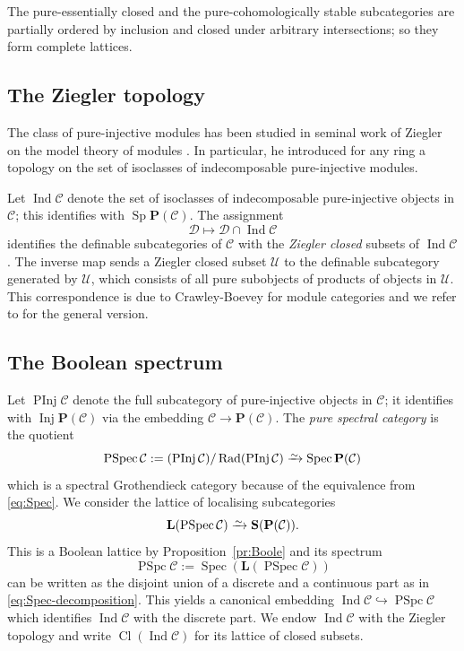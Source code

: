\documentclass[a4paper]{amsart}
\theoremstyle{plain}
\theoremstyle{definition}
\theoremstyle{remark}
\numberwithin{equation}{section}
\newcommand{\Cl}{\operatorname{Cl}}
\newcommand{\Ind}{\operatorname{Ind}}
\newcommand{\Inj}{\operatorname{Inj}}
\newcommand{\PInj}{\operatorname{PInj}}
\newcommand{\PSpc}{\operatorname{PSpc}}
\newcommand{\PSpec}{\operatorname{PSpec}}
\newcommand{\Rad}{\operatorname{Rad}}
\newcommand{\Sp}{\operatorname{Sp}}
\newcommand{\Spec}{\operatorname{Spec}}
\newcommand{\iso}{\xrightarrow{\raisebox{-.4ex}[0ex][0ex]{$\scriptstyle{\sim}$}}}
\def\C{\mathcal C}
\def\D{\mathcal D}
\def\U{\mathcal U}
\def\bfL{\mathbf L}
\def\bfP{\mathbf P}
\def\bfS{\mathbf S}
\begin{document}
The pure-essentially closed and the pure-cohomologically stable subcategories are partially
ordered by inclusion and closed under arbitrary intersections; so they
form complete lattices.


\subsection*{The Ziegler topology}

The class of pure-injective modules has been studied in seminal work
of Ziegler on the model theory of modules \cite{Zi1984}. In
particular, he introduced for any ring a topology on the set of isoclasses of
indecomposable pure-injective modules.

Let $\Ind\C$ denote the set of isoclasses of indecomposable
pure-injective objects in $\C$; this identifies with $\Sp\bfP(\C)$. The assignment
\begin{equation}\label{eq:Ziegler}
  \D\longmapsto\D\cap\Ind\C
\end{equation}  identifies the 
definable subcategories of $\C$ with the \emph{Ziegler closed} subsets
of $\Ind\C$. The inverse map sends a Ziegler closed subset $\U$ to the
definable subcategory  generated by $\U$, which consists of
all pure subobjects of products of objects in $\U$. This
correspondence is due to Crawley-Boevey for module categories
\cite[2.5]{CB1998} and we refer to \cite[12.2]{Kr2022} for the general version.

\subsection*{The Boolean spectrum}

Let $\PInj\C$ denote the full subcategory of pure-injective objects in
$\C$; it identifies with $\Inj\bfP(\C)$ via the embedding
$\C\to\bfP(\C)$. The \emph{pure spectral category} is the quotient
\[\PSpec\C:=(\PInj\C)/\Rad(\PInj\C)\iso\Spec\bfP(\C)\]
which is a spectral Grothendieck category because of the equivalence
from \eqref{eq:Spec}. We consider the lattice of
localising subcategories
\[\bfL(\PSpec\C)\iso\bfS(\bfP(\C)).\]
This is a Boolean lattice by Proposition~\ref{pr:Boole} and  its spectrum
\[\PSpc\C:=\Spec (\bfL(\PSpec\C))\]
can be written as the disjoint union of a discrete and a continuous
part as in \eqref{eq:Spec-decomposition}. This yields a  canonical embedding
$\Ind\C\hookrightarrow\PSpc\C$ 
which identifies $\Ind\C$ with the discrete part. We endow $\Ind\C$
with the Ziegler topology and write $\Cl(\Ind\C)$ for its lattice of
closed subsets.
\end{document}
